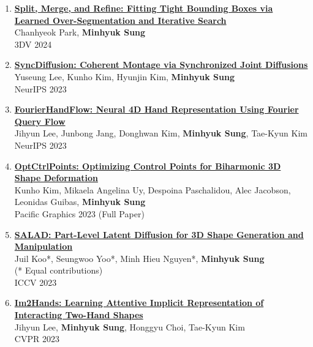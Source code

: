 \documentclass[letterpaper,10pt]{article} %
\newcommand{\blankline}{\quad\pagebreak[2]}
\begin{document}
{\begin{enumerate}
\item \label{3dv24}
\href{https://arxiv.org/abs/2304.04336}{\textbf{Split, Merge, and Refine: Fitting Tight Bounding Boxes via Learned Over-Segmentation and Iterative Search}}\\
Chanhyeok Park, \textbf{Minhyuk Sung}\\
3DV 2024\\
\blankline

\item \label{neurips23_2}
\href{https://arxiv.org/abs/2306.05178}{\textbf{SyncDiffusion: Coherent Montage via Synchronized Joint Diffusions}}\\
Yuseung Lee, Kunho Kim, Hyunjin Kim, \textbf{Minhyuk Sung}\\
NeurIPS 2023\\
\blankline

\item \label{neurips23_1}
\href{https://arxiv.org/abs/2307.08100}{\textbf{FourierHandFlow: Neural 4D Hand Representation Using Fourier Query Flow}}\\
Jihyun Lee, Junbong Jang, Donghwan Kim, \textbf{Minhyuk Sung}, Tae-Kyun Kim\\
NeurIPS 2023\\
\blankline

\item \label{pg23}
\href{https://arxiv.org/abs/2309.12899}{\textbf{OptCtrlPoints: Optimizing Control Points for Biharmonic 3D Shape Deformation}}\\
Kunho Kim, Mikaela Angelina Uy, Despoina Paschalidou, Alec Jacobson, Leonidas Guibas, \textbf{Minhyuk Sung}\\
Pacific Graphics 2023 (Full Paper)\\
\blankline

\item \label{iccv23}
\href{https://arxiv.org/abs/2303.12236}{\textbf{SALAD: Part-Level Latent Diffusion for 3D Shape Generation and Manipulation}}\\
Juil Koo*, Seungwoo Yoo*, Minh Hieu Nguyen*, \textbf{Minhyuk Sung}\\
(* Equal contributions)\\
ICCV 2023\\
\blankline

\item \label{cvpr23_2}
\href{https://arxiv.org/abs/2302.14348}{\textbf{Im2Hands: Learning Attentive Implicit Representation of Interacting Two-Hand Shapes}}\\
Jihyun Lee, \textbf{Minhyuk Sung}, Honggyu Choi, Tae-Kyun Kim\\
CVPR 2023\\
\blankline


\end{enumerate}}
\end{document}
